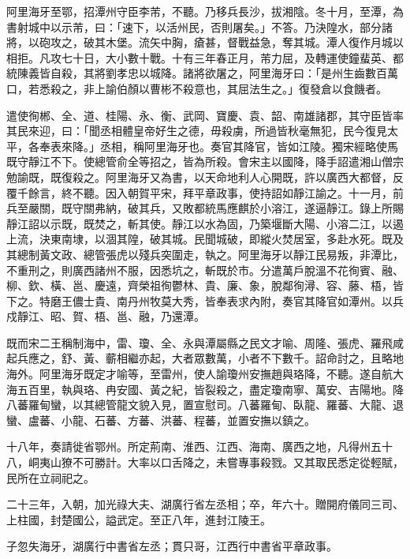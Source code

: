 \begin{pinyinscope}
 阿里海牙至鄂，招潭州守臣李芾，不聽。乃移兵長沙，拔湘陰。冬十月，至潭，為書射城中以示芾，曰：「速下，以活州民，否則屠矣。」不答。乃決隍水，部分諸將，以砲攻之，破其木堡。流矢中胸，瘡甚，督戰益急，奪其城。潭人復作月城以相拒。凡攻七十日，大小數十戰。十有三年春正月，芾力屈，及轉運使鐘蜚英、都統陳義皆自殺，其將劉孝忠以城降。諸將欲屠之，阿里海牙曰：「是州生齒數百萬口，若悉殺之，非上諭伯顏以曹彬不殺意也，其屈法生之。」復發倉以食饑者。



 遣使徇郴、全、道、桂陽、永、衡、武岡、寶慶、袁、韶、南雄諸郡，其守臣皆率其民來迎，曰：「聞丞相體皇帝好生之德，毋殺虜，所過皆秋毫無犯，民今復見太平，各奉表來降。」丞相，稱阿里海牙也。奏官其降官，皆如江陵。獨宋經略使馬既守靜江不下。使總管俞全等招之，皆為所殺。會宋主以國降，降手詔遣湘山僧宗勉諭既，既復殺之。阿里海牙又為書，以天命地利人心開既，許以廣西大都督，反覆千餘言，終不聽。因入朝賀平宋，拜平章政事，使持詔如靜江諭之。十一月，前兵至嚴關，既守關弗納，破其兵，又敗都統馬應麒於小溶江，遂逼靜江。錄上所賜靜江詔以示既，既焚之，斬其使。靜江以水為固，乃築堰斷大陽、小溶二江，以遏上流，決東南埭，以涸其隍，破其城。民聞城破，即縱火焚居室，多赴水死。既及其總制黃文政、總管張虎以殘兵突圍走，執之。阿里海牙以靜江民易叛，非潭比，不重刑之，則廣西諸州不服，因悉坑之，斬既於市。分遣萬戶脫溫不花徇賓、融、柳、欽、橫、邕、慶遠，齊榮祖徇鬱林、貴、廉、象，脫鄰徇潯、容、藤、梧，皆下之。特磨王儂士貴、南丹州牧莫大秀，皆奉表求內附，奏官其降官如潭州。以兵戍靜江、昭、賀、梧、邕、融，乃還潭。



 既而宋二王稱制海中，雷、瓊、全、永與潭屬縣之民文才喻、周隆、張虎、羅飛咸起兵應之，舒、黃、蘄相繼亦起，大者眾數萬，小者不下數千。詔命討之，且略地海外。阿里海牙既定才喻等，至雷州，使人諭瓊州安撫趙與珞降，不聽。遂自航大海五百里，執與珞、冉安國、黃之紀，皆裂殺之，盡定瓊南寧、萬安、吉陽地。降八蕃羅甸蠻，以其總管龍文貌入見，置宣慰司。八蕃羅甸、臥龍、羅蕃、大龍、退蠻、盧蕃、小龍、石蕃、方蕃、洪蕃、程蕃，並置安撫以鎮之。



 十八年，奏請徙省鄂州。所定荊南、淮西、江西、海南、廣西之地，凡得州五十八，峒夷山獠不可勝計。大率以口舌降之，未嘗專事殺戮。又其取民悉定從輕賦，民所在立祠祀之。



 二十三年，入朝，加光祿大夫、湖廣行省左丞相；卒，年六十。贈開府儀同三司、上柱國，封楚國公，謚武定。至正八年，進封江陵王。



 子忽失海牙，湖廣行中書省左丞；貫只哥，江西行中書省平章政事。




\end{pinyinscope}
